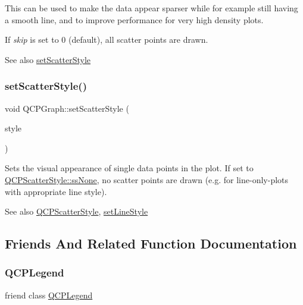 This can be used to make the data appear sparser while for example still having a smooth line, and to improve performance for very high density plots.

If {\itshape skip} is set to 0 (default), all scatter points are drawn.

\begin{DoxySeeAlso}{See also}
\mbox{\hyperlink{class_q_c_p_graph_a12bd17a8ba21983163ec5d8f42a9fea5}{set\+Scatter\+Style}} 
\end{DoxySeeAlso}
\mbox{\label{class_q_c_p_graph_a12bd17a8ba21983163ec5d8f42a9fea5}} 
\subsubsection{\texorpdfstring{setScatterStyle()}{setScatterStyle()}}
{\footnotesize\ttfamily void Q\+C\+P\+Graph\+::set\+Scatter\+Style (\begin{DoxyParamCaption}\item[{const \mbox{\hyperlink{class_q_c_p_scatter_style}{Q\+C\+P\+Scatter\+Style}} \&}]{style }\end{DoxyParamCaption})}

Sets the visual appearance of single data points in the plot. If set to \mbox{\hyperlink{class_q_c_p_scatter_style_adb31525af6b680e6f1b7472e43859349abd144c291ca274f77053ec68cab6c022}{Q\+C\+P\+Scatter\+Style\+::ss\+None}}, no scatter points are drawn (e.\+g. for line-\/only-\/plots with appropriate line style).

\begin{DoxySeeAlso}{See also}
\mbox{\hyperlink{class_q_c_p_scatter_style}{Q\+C\+P\+Scatter\+Style}}, \mbox{\hyperlink{class_q_c_p_graph_a513fecccff5b2a50ce53f665338c60ff}{set\+Line\+Style}} 
\end{DoxySeeAlso}


\subsection{Friends And Related Function Documentation}
\mbox{\label{class_q_c_p_graph_a8429035e7adfbd7f05805a6530ad5e3b}} 
\subsubsection{\texorpdfstring{QCPLegend}{QCPLegend}}
{\footnotesize\ttfamily friend class \mbox{\hyperlink{class_q_c_p_legend}{Q\+C\+P\+Legend}}\hspace{0.3cm}{\ttfamily [friend]}}

